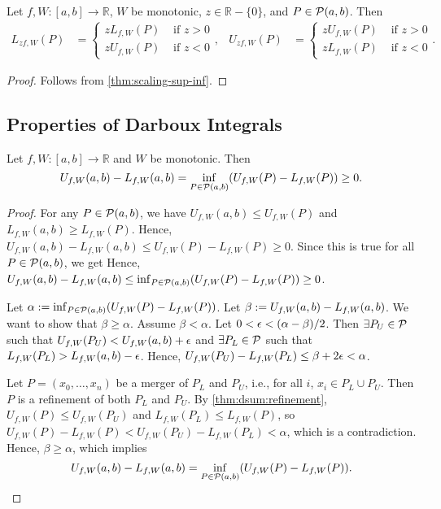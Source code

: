 \documentclass[a4paper,12pt,fleqn]{article}
\begin{document}
\begin{lemma}
\label{thm:dsum:scaling}
Let $f, W: [a, b] \to \mathbb{R}$, $W$ be monotonic,
$z \in \mathbb{R} - \{0\}$, and $P \in \mathcal{P}(a, b)$. Then
\begin{align*}
L_{zf,W}(P) &= \begin{cases}
    zL_{f,W}(P) & \text{ if } z > 0
    \\ zU_{f,W}(P) & \text{ if } z < 0
\end{cases},
& U_{zf,W}(P) &= \begin{cases}
    zU_{f,W}(P) & \text{ if } z > 0
    \\ zL_{f,W}(P) & \text{ if } z < 0
\end{cases}.
\end{align*}
\end{lemma}
\begin{proof}
Follows from \cref{thm:scaling-sup-inf}.
\end{proof}

\subsection{Properties of Darboux Integrals}

\begin{lemma}
\label{thm:dint:l-le-u}
Let $f, W: [a, b] \to \mathbb{R}$ and $W$ be monotonic. Then
\[ U_{f,W}(a, b) - L_{f,W}(a, b) = \inf_{P \in \mathcal{P}(a, b)} (U_{f,W}(P) - L_{f,W}(P)) \ge 0. \]
\end{lemma}
\begin{proof}
For any $P \in \mathcal{P}(a, b)$, we have $U_{f,W}(a, b) \le U_{f,W}(P)$
and $L_{f,W}(a, b) \ge L_{f,W}(P)$.
Hence, $U_{f,W}(a, b) - L_{f,W}(a, b) \le U_{f,W}(P) - L_{f,W}(P) \ge 0$.
Since this is true for all $P \in \mathcal{P}(a, b)$, we get
Hence, $U_{f,W}(a, b) - L_{f,W}(a, b) \le \inf_{P \in \mathcal{P}(a, b)} (U_{f,W}(P) - L_{f,W}(P)) \ge 0$.

Let $\alpha := \inf_{P \in \mathcal{P}(a, b)} (U_{f,W}(P) - L_{f,W}(P))$.
Let $\beta := U_{f,W}(a, b) - L_{f,W}(a, b)$.
We want to show that $\beta \ge \alpha$. Assume $\beta < \alpha$.
Let $0 < \epsilon < (\alpha - \beta) / 2$.
Then $\exists P_U \in \mathcal{P}$ such that $U_{f,W}(P_U) < U_{f,W}(a, b) + \epsilon$
and $\exists P_L \in \mathcal{P}$ such that $L_{f,W}(P_L) > L_{f,W}(a, b) - \epsilon$.
Hence, $U_{f,W}(P_U) - L_{f,W}(P_L) \le \beta + 2\epsilon < \alpha$.

Let $P = (x_0, \ldots, x_n)$ be a merger of $P_L$ and $P_U$,
i.e., for all $i$, $x_i \in P_L \cup P_U$.
Then $P$ is a refinement of both $P_L$ and $P_U$.
By \cref{thm:dsum:refinement}, $U_{f,W}(P) \le U_{f,W}(P_U)$ and $L_{f,W}(P_L) \le L_{f,W}(P)$,
so $U_{f,W}(P) - L_{f,W}(P) < U_{f,W}(P_U) - L_{f,W}(P_L) < \alpha$, which is a contradiction.
Hence, $\beta \ge \alpha$, which implies
\[ U_{f,W}(a, b) - L_{f,W}(a, b) = \inf_{P \in \mathcal{P}(a, b)} (U_{f,W}(P) - L_{f,W}(P)). \]
\end{proof}
\end{document}
